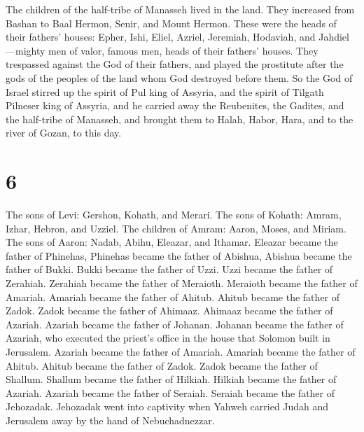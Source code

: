  The children of the half-tribe of Manasseh lived in the
land. They increased from Bashan to Baal Hermon, Senir, and Mount
Hermon.  These were the heads of their fathers' houses:
Epher, Ishi, Eliel, Azriel, Jeremiah, Hodaviah, and Jahdiel---mighty men
of valor, famous men, heads of their fathers' houses. 
They trespassed against the God of their fathers, and played the
prostitute after the gods of the peoples of the land whom God destroyed
before them.  So the God of Israel stirred up the spirit
of Pul king of Assyria, and the spirit of Tilgath Pilneser king of
Assyria, and he carried away the Reubenites, the Gadites, and the
half-tribe of Manasseh, and brought them to Halah, Habor, Hara, and to
the river of Gozan, to this day.

\hypertarget{section-5}{%
\section{6}\label{section-5}}

 The sons of Levi: Gershon, Kohath, and Merari.
 The sons of Kohath: Amram, Izhar, Hebron, and Uzziel.
 The children of Amram: Aaron, Moses, and Miriam. The sons
of Aaron: Nadab, Abihu, Eleazar, and Ithamar.  Eleazar
became the father of Phinehas, Phinehas became the father of Abishua,
 Abishua became the father of Bukki. Bukki became the
father of Uzzi.  Uzzi became the father of Zerahiah.
Zerahiah became the father of Meraioth.  Meraioth became
the father of Amariah. Amariah became the father of Ahitub.
 Ahitub became the father of Zadok. Zadok became the
father of Ahimaaz.  Ahimaaz became the father of Azariah.
Azariah became the father of Johanan.  Johanan became the
father of Azariah, who executed the priest's office in the house that
Solomon built in Jerusalem.  Azariah became the father of
Amariah. Amariah became the father of Ahitub.  Ahitub
became the father of Zadok. Zadok became the father of Shallum.
 Shallum became the father of Hilkiah. Hilkiah became the
father of Azariah.  Azariah became the father of Seraiah.
Seraiah became the father of Jehozadak.  Jehozadak went
into captivity when Yahweh carried Judah and Jerusalem away by the hand
of Nebuchadnezzar.

